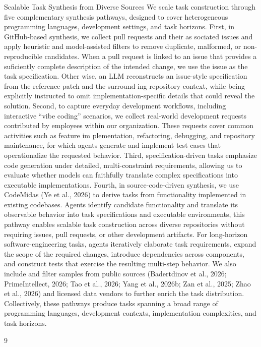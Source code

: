 \documentclass[
  10
]{article}
\begin{document}
Scalable Task Synthesis from Diverse Sources We scale task construction
through five complementary synthesis pathways, designed to cover
heterogeneous programming languages, development settings, and task
horizons. First, in GitHub-based synthesis, we collect pull requests and
their as sociated issues and apply heuristic and model-assisted filters
to remove duplicate, malformed, or non-reproducible candidates. When a
pull request is linked to an issue that provides a suficiently complete
description of the intended change, we use the issue as the task
specification. Other wise, an LLM reconstructs an issue-style
specification from the reference patch and the surround ing repository
context, while being explicitly instructed to omit
implementation-specific details that could reveal the solution. Second,
to capture everyday development workflows, including interactive ``vibe
coding'' scenarios, we collect real-world development requests
contributed by employees within our organization. These requests cover
common activities such as feature im plementation, refactoring,
debugging, and repository maintenance, for which agents generate and
implement test cases that operationalize the requested behavior. Third,
specification-driven tasks emphasize code generation under detailed,
multi-constraint requirements, allowing us to evaluate whether models
can faithfully translate complex specifications into executable
implementations. Fourth, in source-code-driven synthesis, we use
CodeMidas (Ye et al., 2026) to derive tasks from functionality
implemented in existing codebases. Agents identify candidate
functionality and translate its observable behavior into task
specifications and executable environments, this pathway enables
scalable task construction across diverse repositories without requiring
issues, pull requests, or other development artifacts. For long-horizon
software-engineering tasks, agents iteratively elaborate task
requirements, expand the scope of the required changes, introduce
dependencies across components, and construct tests that exercise the
resulting multi-step behavior. We also include and filter samples from
public sources (Badertdinov et al., 2026; PrimeIntellect, 2026; Tao et
al., 2026; Yang et al., 2026b; Zan et al., 2025; Zhao et al., 2026) and
licensed data vendors to further enrich the task distribution.
Collectively, these pathways produce tasks spanning a broad range of
programming languages, development contexts, implementation
complexities, and task horizons.

9
\end{document}
